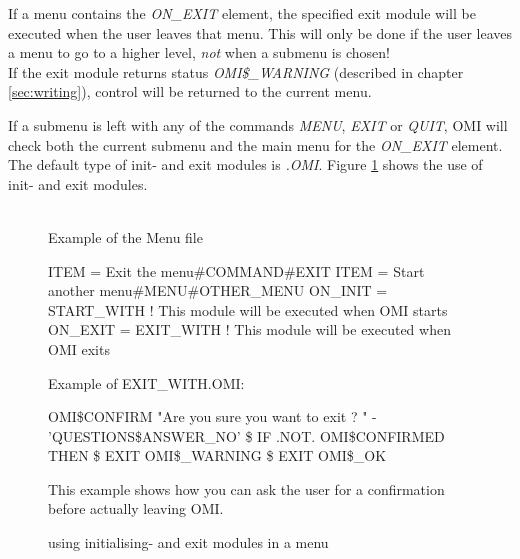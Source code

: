 \documentclass[a4paper]{book}
\newcommand{\vs}{\vspace{3mm}}
\renewcommand{\indent}{\hspace*{5mm}}
\begin{document}
\vs

If a menu contains the \textsl{ON{\_}EXIT} element, the 
specified exit module will be executed when the user leaves that menu. This 
will only be done if the user leaves a menu to go to a higher level, \textit{not} when a 
submenu is chosen! \\
If the exit module returns status \textsl{OMI{\$}{\_}WARNING} (described in chapter 
\ref{sec:writing}), control will be returned to the current menu.

\vs

If a submenu is left with any of the commands \textsl{MENU}, \textsl{EXIT} or \textsl{QUIT}, OMI will 
check both the current submenu and the main menu for the \textsl{ON{\_}EXIT} element. \\
The default type of init- and exit modules is \textsl{.OMI}. Figure \ref{fig:iemods}
shows the use of init- and exit modules.

\begin{figure}[h!tb]
\begin{minipage}[h!tb]{\textwidth}
\hrulefill \\
\noindent Example of the Menu file\newline
\begin{ttfamily}\begin{small}
 \newline
\indent ITEM = Exit the menu{\#}COMMAND{\#}EXIT \newline
\indent ITEM = Start another menu{\#}MENU{\#}OTHER{\_}MENU \newline
\indent ON{\_}INIT = START{\_}WITH ! This module will be executed when OMI starts \newline
\indent ON{\_}EXIT = EXIT{\_}WITH ! This module will be executed when OMI exits \newline
\end{small}\end{ttfamily}
\vspace{1mm} 
\noindent Example of EXIT{\_}WITH.OMI:\newline
\begin{ttfamily}\begin{small}
\noindent{\$} OMI{\$}CONFIRM "Are you sure you want to exit ? " - \newline
\indent 'QUESTIONS{\$}ANSWER{\_}NO'
{\$} IF .NOT. OMI{\$}CONFIRMED THEN {\$} EXIT OMI{\$}{\_}WARNING \newline
{\$} EXIT OMI{\$}{\_}OK\newline
\end{small}\end{ttfamily}
\noindent This example shows how you can ask the user for a confirmation before 
actually leaving OMI.
\caption{using initialising- and exit modules in a menu}\label{fig:iemods}
\hrulefill
\end{minipage}
\end{figure}
\end{document}
